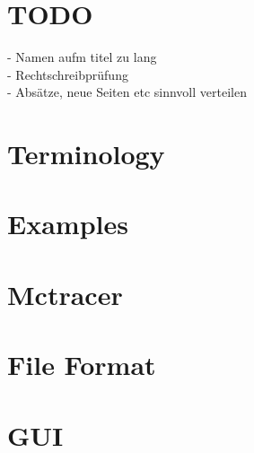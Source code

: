 \documentclass{scrartcl}
\begin{document}
\maketitle
\tableofcontents
\newpage

\section{TODO}
- Namen aufm titel zu lang \\
- Rechtschreibprüfung \\
- Absätze, neue Seiten etc sinnvoll verteilen \\

\section{Terminology} 
\section{Examples} 
\section{Mctracer} 
\section{File Format} 
\section{GUI} 
\end{document}
